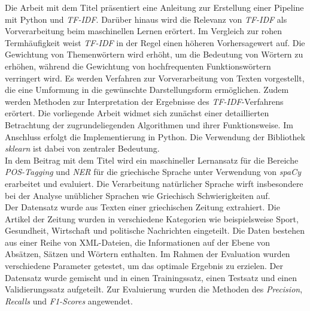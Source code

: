 Die Arbeit mit dem Titel \cite{lavin2019analyzing} präsentiert eine Anleitung zur Erstellung einer Pipeline mit Python und \emph{TF-IDF}. Darüber hinaus wird die Relevanz von \emph{TF-IDF} als Vorverarbeitung beim maschinellen Lernen erörtert. Im Vergleich zur rohen Termhäufigkeit weist \emph{TF-IDF} in der Regel einen höheren Vorhersagewert auf. Die Gewichtung von Themenwörtern wird erhöht, um die Bedeutung von Wörtern zu erhöhen, während die Gewichtung von hochfrequenten Funktionswörtern verringert wird. Es werden Verfahren zur Vorverarbeitung von Texten vorgestellt, die eine Umformung in die gewünschte Darstellungsform ermöglichen. Zudem werden Methoden zur Interpretation der Ergebnisse des \emph{TF-IDF}-Verfahrens erörtert. Die vorliegende Arbeit widmet sich zunächst einer detaillierten Betrachtung der zugrundeliegenden Algorithmen und ihrer Funktionsweise. Im Anschluss erfolgt die Implementierung in Python. Die Verwendung der Bibliothek \emph{sklearn} ist dabei von zentraler Bedeutung.\\

In dem Beitrag mit dem Titel \cite{partalidou2019design} wird ein maschineller Lernansatz für die Bereiche \emph{POS-Tagging} und \emph{NER} für die griechische Sprache unter Verwendung von \emph{spaCy} erarbeitet und evaluiert. Die Verarbeitung natürlicher Sprache wirft insbesondere bei der Analyse unüblicher Sprachen wie Griechisch Schwierigkeiten auf.\\ Der Datensatz wurde aus Texten einer griechischen Zeitung extrahiert. Die Artikel der Zeitung wurden in verschiedene Kategorien wie beispielsweise Sport, Gesundheit, Wirtschaft und politische Nachrichten eingeteilt. Die Daten bestehen aus einer Reihe von XML-Dateien, die Informationen auf der Ebene von Absätzen, Sätzen und Wörtern enthalten. Im Rahmen der Evaluation wurden verschiedene Parameter getestet, um das optimale Ergebnis zu erzielen. Der Datensatz wurde gemischt und in einen Trainingssatz, einen Testsatz und einen Validierungssatz aufgeteilt. Zur Evaluierung wurden die Methoden des \emph{Precision}, \emph{Recalls} und \emph{F1-Scores} angewendet.

